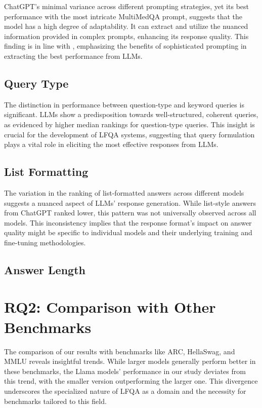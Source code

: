ChatGPT's minimal variance across different prompting strategies, yet its best performance with the most intricate MultiMedQA prompt, suggests that the model has a high degree of adaptability. It can extract and utilize the nuanced information provided in complex prompts, enhancing its response quality. This finding is in line with \cite{reynolds:2021:Prompt}, emphasizing the benefits of sophisticated prompting in extracting the best performance from LLMs.

\subsection{Query Type}
The distinction in performance between question-type and keyword queries is significant. LLMs show a predisposition towards well-structured, coherent queries, as evidenced by higher median rankings for question-type queries. This insight is crucial for the development of LFQA systems, suggesting that query formulation plays a vital role in eliciting the most effective responses from LLMs.

\subsection{List Formatting}
The variation in the ranking of list-formatted answers across different models suggests a nuanced aspect of LLMs' response generation. While list-style answers from ChatGPT ranked lower, this pattern was not universally observed across all models. This inconsistency implies that the response format's impact on answer quality might be specific to individual models and their underlying training and fine-tuning methodologies.

\subsection{Answer Length}

\section{RQ2: Comparison with Other Benchmarks}

The comparison of our results with benchmarks like ARC, HellaSwag, and MMLU reveals insightful trends. While larger models generally perform better in these benchmarks, the Llama models' performance in our study deviates from this trend, with the smaller version outperforming the larger one. This divergence underscores the specialized nature of LFQA as a domain and the necessity for benchmarks tailored to this field.

